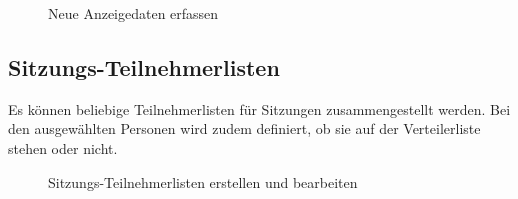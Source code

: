 \begin{figure}[H]
\caption{Neue Anzeigedaten erfassen}
\end{figure}


\clearpage
\subsection{Sitzungs-Teilnehmerlisten}

Es können beliebige Teilnehmerlisten für Sitzungen zusammengestellt werden. Bei den ausgewählten Personen wird zudem definiert, ob sie auf der Verteilerliste stehen oder nicht.

\begin{figure}[H]
\end{figure}

\begin{figure}[H]
\vspace{-25pt}
\caption{Sitzungs-Teilnehmerlisten erstellen und bearbeiten}
\end{figure}

